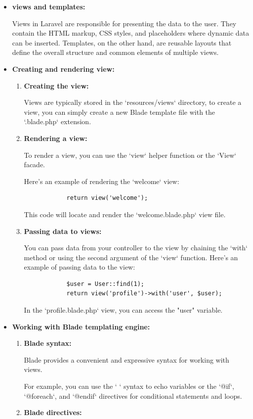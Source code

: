 \begin{itemize}
    \item \textbf{views and templates:}
    
    Views in Laravel are responsible for presenting the data to the user. They contain the HTML markup, CSS styles, and placeholders where dynamic data can be inserted. Templates, on the other hand, are reusable layouts that define the overall structure and common elements of multiple views.
    \item \textbf{Creating and rendering view:}
    \begin{enumerate}
        \item \textbf{Creating the view:}
        
        Views are typically stored in the `resources/views` directory, to create a view, you can simply create a new Blade template file with the `.blade.php` extension.
        \item \textbf{Rendering a view:}
        
        To render a view, you can use the `view` helper function or the `View` facade.
        
        Here's an example of rendering the `welcome` view:
        \begin{verbatim}
            return view('welcome');
        \end{verbatim}
        This code will locate and render the `welcome.blade.php` view file.
        \item \textbf{Passing data to views:}
        
        You can pass data from your controller to the view by chaining the `with` method or using the second argument of the `view` function.
        Here's an example of passing data to the view:
        \begin{verbatim}
            $user = User::find(1);
            return view('profile')->with('user', $user);
        \end{verbatim}
        In the `profile.blade.php` view, you can access the "user" variable.
     \end{enumerate}
     \item \textbf{Working with Blade templating engine:}
     \begin{enumerate}
        \item \textbf{Blade syntax:}
        
        Blade provides a convenient and expressive syntax for working with views.
        
        For example, you can use the `{{ }}` syntax to echo variables or the `@if`, `@foreach`, and `@endif` directives for conditional statements and loops.
        \item \textbf{Blade directives:}
        

\end{enumerate}
\end{itemize}
